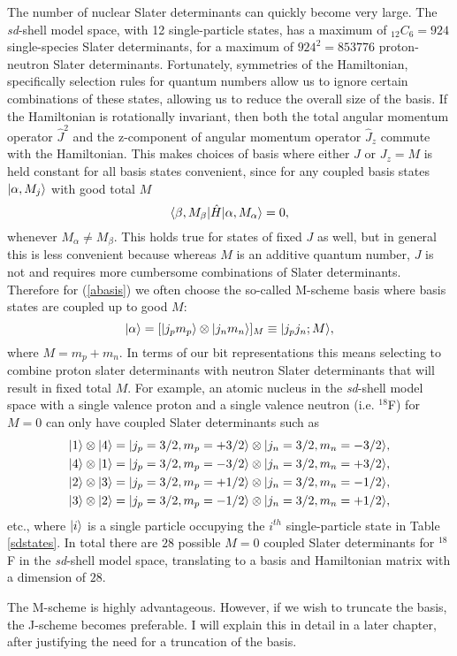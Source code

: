 The number of nuclear Slater determinants can quickly become very large.
The \textit{sd}-shell model space, with 12 single-particle states, has a maximum
of $_{12}C_6=924$ single-species Slater determinants, for a maximum of $924^2=853776$
proton-neutron Slater determinants. Fortunately, symmetries of the Hamiltonian,
specifically selection rules for quantum numbers allow us to ignore certain 
combinations of these states, allowing us to reduce the overall size of the basis.
If the Hamiltonian is rotationally invariant, then
both the total angular momentum operator $\hat{J}^2$ and the z-component of angular
momentum operator $\hat{J}_z$ commute with the Hamiltonian. This makes choices 
of basis where either $J$ or $J_z=M$ is held constant for all basis states convenient\cite{Johnson13},
since for any coupled basis states $|\alpha,M_j\rangle$ with good total $M$
\begin{equation}
    \langle \beta,M_\beta|\hat{H}|\alpha,M_\alpha\rangle = 0,
\end{equation}
whenever $M_\alpha\neq M_\beta$. This holds true for states of fixed $J$ as well, but in general
this is less convenient because whereas $M$ is an additive quantum number,
$J$ is not and requires more cumbersome combinations of Slater determinants\cite{Johnson13}.
Therefore for (\ref{abasis}) we often choose the so-called M-scheme basis where
basis states are coupled up to good $M$:
\begin{equation}
    |\alpha\rangle = [|j_pm_p\rangle\otimes|j_nm_n\rangle]_M \equiv |j_pj_n;M\rangle,
\end{equation}
where $M=m_p+m_n$. In terms of our bit representations this means selecting to 
combine proton slater determinants with neutron Slater determinants that will
result in fixed total $M$. For example, an atomic nucleus in the \textit{sd}-shell
model space with a single valence proton and a single valence neutron (i.e. $^{18}$F)
for $M=0$ can only have coupled Slater determinants such as 
\begin{equation}\begin{split}
    |1\rangle\otimes|4\rangle=|j_p=3/2,m_p=+3/2\rangle&\otimes|j_n=3/2,m_n=-3/2\rangle,\\
    |4\rangle\otimes|1\rangle=|j_p=3/2,m_p=-3/2\rangle&\otimes|j_n=3/2,m_n=+3/2\rangle,\\
    |2\rangle\otimes|3\rangle=|j_p=3/2,m_p=+1/2\rangle&\otimes|j_n=3/2,m_n=-1/2\rangle,\\
    |3\rangle\otimes|2\rangle=|j_p=3/2,m_p=-1/2\rangle&\otimes|j_n=3/2,m_n=+1/2\rangle,\\
\end{split}\end{equation}
etc., where $|i\rangle$ is a single particle occupying the $i^{th}$ single-particle 
state in Table \ref{sdstates}. In total there are $28$ possible $M=0$ coupled
Slater determinants for $^{18}$F in the \textit{sd}-shell model space, translating
to a basis and Hamiltonian matrix with a dimension of $28$. 

The M-scheme is highly advantageous. However, if we wish to truncate the basis,
the J-scheme becomes preferable. I will explain this in detail in a later chapter, 
after justifying the need for a truncation of the basis.





 


